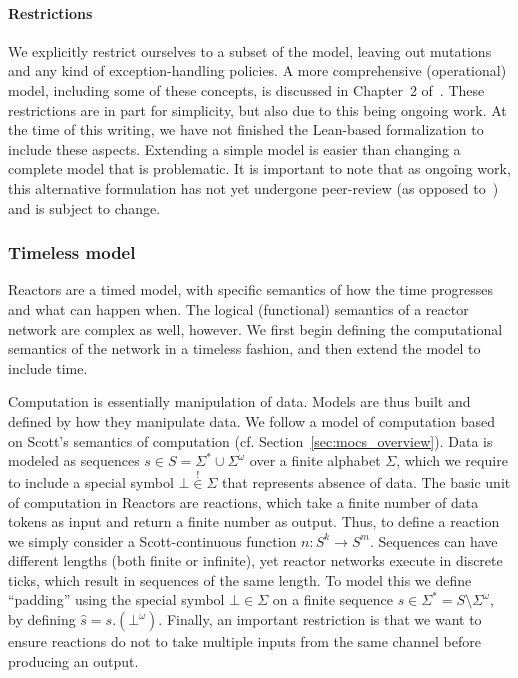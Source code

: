\paragraph{Restrictions}

We explicitly restrict ourselves to a subset of the model, leaving out mutations and any kind of exception-handling policies.
A more comprehensive (operational) model, including some of these concepts, is discussed in Chapter~2 of~\cite{lohstroh_phdthesis}.
These restrictions are in part for simplicity, but also due to this being ongoing work.
At the time of this writing, we have not finished the Lean-based formalization to include these aspects.
Extending a simple model is easier than changing a complete model that is problematic.
It is important to note that as ongoing work, this alternative formulation has not yet undergone peer-review (as opposed to~\cite{lohstroh_cyphy19}) and is subject to change.

\subsubsection{Timeless model}

Reactors are a timed model, with specific semantics of how the time progresses and what can happen when.
The logical (functional) semantics of a reactor network are complex as well, however.
We first begin defining the computational semantics of the network in a timeless fashion, and then extend the model to include time.

Computation is essentially manipulation of data.
Models are thus built and defined by how they manipulate data.
We follow a model of computation based on Scott's semantics of computation (cf. Section~\ref{sec:mocs_overview}).
Data is modeled as sequences $s \in S = \Sigma^* \cup \Sigma^\omega$ over a finite alphabet $\Sigma$, which we require to include a special symbol $\bot \overset{!}{\in} \Sigma$ that represents absence of data.
The basic unit of computation in Reactors are reactions, which take a finite number of data tokens as input and return a finite number as output.
Thus, to define a reaction we simply consider a Scott-continuous function $n : S^k \rightarrow S^m$.
Sequences can have different lengths (both finite or infinite), yet reactor networks execute in discrete ticks, which result in sequences of the same length.
To model this we define ``padding'' using the special symbol $\bot \in \Sigma$ on a finite sequence $s \in \Sigma^* = S \setminus \Sigma^\omega$, by defining $\hat s  = s.(\bot^\omega)$. 
Finally, an important restriction is that we want to ensure reactions do not to take multiple inputs from the same channel before producing an output. 

